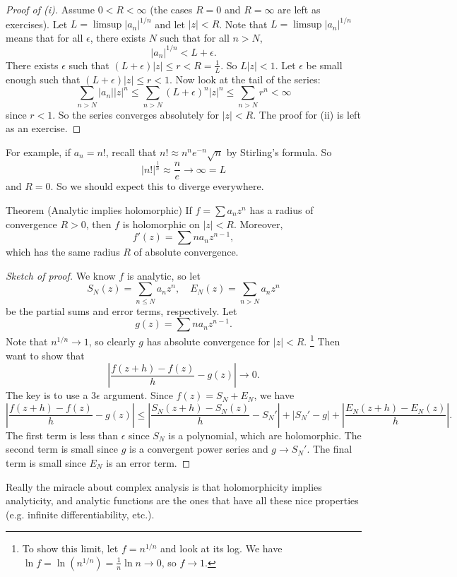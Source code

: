 \begin{proof}[Proof of (i)]
  Assume $0 < R < \infty$ (the cases $R = 0$ and
  $R = \infty$ are left as exercises). Let
  $L = \limsup |a_n|^{1 / n}$ and let $|z| < R$.
  Note that $L = \limsup |a_n|^{1 / n}$ means that for
  all $\epsilon$, there exists $N$ such that
  for all $n > N$,
  \[
    |a_n|^{1 / n} < L + \epsilon
  .\]
  There exists $\epsilon$ such that
  $(L + \epsilon)|z| \le r < R = \frac{1}{L}$.
  So $L|z| < 1$. Let $\epsilon$ be small enough such
  that $(L + \epsilon)|z| \le r < 1$.
  Now look at the tail of the series:
  \[
    \sum_{n > N} |a_n| |z|^n
    \le \sum_{n > N} (L + \epsilon)^n |z|^n
    \le \sum_{n > N} r^n < \infty
  \]
  since $r < 1$. So the series converges absolutely
  for $|z| < R$.
  The proof for (ii) is left as an exercise.
\end{proof}

For example, if $a_n = n!$, recall that
$n! \approx n^n e^{-n} \sqrt{n}$ by Stirling's formula.
So
\[
  \left|n!\right|^{\frac{1}{n}}
  \approx \frac{n}{e} \to \infty = L
\]
and $R = 0$. So we should expect this to diverge
everywhere.

\begin{thm}{Theorem (Analytic implies holomorphic)}
  If $f = \sum a_n z^n$ has a radius of convergence
  $R > 0$, then $f$ is holomorphic on $|z| < R$.
  Moreover,
  \[
    f'(z) = \sum n a_n z^{n - 1}
  ,\]
  which has the same radius $R$ of absolute convergence.
\end{thm}

\begin{proof}[Sketch of proof]
  We know $f$ is analytic, so let
  \[S_N(z) = \sum_{n \le N} a_n z^n, \quad E_N(z) = \sum_{n > N} a_n z^n\]
  be the partial sums and error terms, respectively.
  Let
  \[
    g(z) = \sum n a_n z^{n - 1}
  .\]
  Note that $n^{1 / n} \to 1$, so clearly $g$ has
  absolute convergence for $|z| < R$.
  \footnote{
    To show this limit, let $f = n^{1 / n}$ and look at
    its log. We have
    $\ln f = \ln(n^{1 / n}) = \frac{1}{n} \ln n \to 0$,
    so $f \to 1$.
  }
  Then want to
  show that
  \[
    \left|\frac{f(z + h) - f(z)}{h} - g(z)\right| \to 0
  .\]
  The key is to use a $3\epsilon$ argument.
  Since $f(z) = S_N + E_N$, we have
  \[
    \left|\frac{f(z + h) - f(z)}{h} - g(z)\right|
    \le \left|\frac{S_N(z + h) - S_N(z)}{h} - S_N'\right|
    + |S_N' - g| + \left|\frac{E_N(z + h) - E_N(z)}{h}\right|
  .\]
  The first term is less than $\epsilon$ since
  $S_N$ is a polynomial, which are holomorphic.
  The second term is small since $g$ is a convergent
  power series and $g \to S_N'$. The final term is
  small since $E_N$ is an error term.
\end{proof}

\begin{remark}
  Really the miracle about complex analysis is
  that holomorphicity implies analyticity, and analytic
  functions are the ones that have all these nice
  properties (e.g. infinite differentiability, etc.).
\end{remark}

